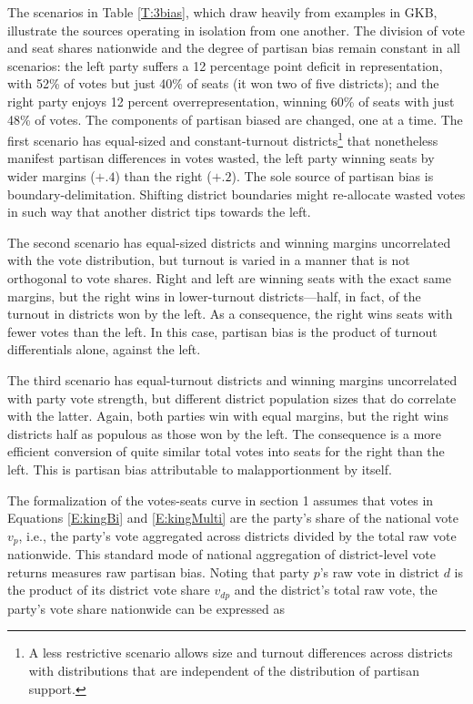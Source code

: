 \documentclass[letter,12pt]{article}
\begin{document}
The scenarios in Table \ref{T:3bias}, which draw heavily from examples in GKB, illustrate the sources operating in isolation from one another. The division of vote and seat shares nationwide and the degree of partisan bias remain constant in all scenarios: the left party suffers a 12 percentage point deficit in representation, with 52\% of votes but just 40\% of seats (it won two of five districts); and the right party enjoys 12 percent overrepresentation, winning 60\% of seats with just 48\% of votes. The components of partisan biased are changed, one at a time. The first scenario has equal-sized and constant-turnout districts\footnote{A less restrictive scenario allows size and turnout differences across districts with distributions that are independent of the distribution of partisan support.} that nonetheless manifest partisan differences in votes wasted, the left party winning seats by wider margins ($+.4$) than the right ($+.2$). The sole source of partisan bias is boundary-delimitation. Shifting district boundaries might re-allocate wasted votes in such way that another district tips towards the left. 

The second scenario has equal-sized districts and winning margins uncorrelated with the vote distribution, but turnout is varied in a manner that is not orthogonal to vote shares. Right and left are winning seats with the exact same margins, but the right wins in lower-turnout districts---half, in fact, of the turnout in districts won by the left. As a consequence, the right wins seats with fewer votes than the left. In this case, partisan bias is the product of turnout differentials alone, against the left. 

The third scenario has equal-turnout districts and winning margins uncorrelated with party vote strength, but different district population sizes that do correlate with the latter. Again, both parties win with equal margins, but the right wins districts half as populous as those won by the left. The consequence is a more efficient conversion of quite similar total votes into seats for the right than the left. This is partisan bias attributable to malapportionment by itself.

The formalization of the votes-seats curve in section 1 assumes that votes in Equations \ref{E:kingBi} and \ref{E:kingMulti} are the party's share of the national vote $v_p$, i.e., the party's vote aggregated across districts divided by the total raw vote nationwide. This standard mode of national aggregation of district-level vote returns measures raw partisan bias. Noting that party $p$'s raw vote in district $d$ is the product of its district vote share $v_{dp}$ and the district's total raw vote, the party's vote share nationwide can be expressed as 
\end{document}
